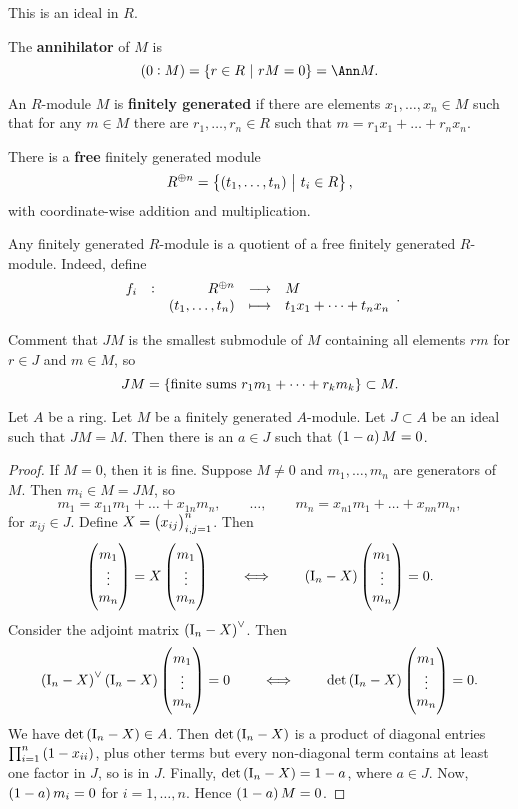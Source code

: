 This is an ideal in $ R $.

\begin{example*}
The \textbf{annihilator} of $ M $ is
$$ \br{0 : M} = \cbr{r \in R \st rM = 0} = \Ann M. $$
\end{example*}

\pagebreak

\begin{definition}
An $ R $-module $ M $ is \textbf{finitely generated} if there are elements $ x_1, \dots, x_n \in M $ such that for any $ m \in M $ there are $ r_1, \dots, r_n \in R $ such that $ m = r_1x_1 + \dots + r_nx_n $.
\end{definition}

\begin{example*}
There is a \textbf{free} finitely generated module
$$ R^{\oplus n} = \cbr{\br{t_1, \dots, t_n} \st t_i \in R}, $$
with coordinate-wise addition and multiplication.
\end{example*}

\begin{remark*}
Any finitely generated $ R $-module is a quotient of a free finitely generated $ R $-module. Indeed, define
$$ \function[f_i]{R^{\oplus n}}{M}{\br{t_1, \dots, t_n}}{t_1x_1 + \dots + t_nx_n}. $$
\end{remark*}

Comment that $ JM $ is the smallest submodule of $ M $ containing all elements $ rm $ for $ r \in J $ and $ m \in M $, so
$$ JM = \cbr{\text{finite sums} \ r_1m_1 + \dots + r_km_k} \subset M. $$

\begin{lemma}
\label{lem:9.7}
Let $ A $ be a ring. Let $ M $ be a finitely generated $ A $-module. Let $ J \subset A $ be an ideal such that $ JM = M $. Then there is an $ a \in J $ such that $ \br{1 - a}M = 0 $.
\end{lemma}

\begin{proof}
If $ M = 0 $, then it is fine. Suppose $ M \ne 0 $ and $ m_1, \dots, m_n $ are generators of $ M $. Then $ m_i \in M = JM $, so
$$ m_1 = x_{11}m_1 + \dots + x_{1n}m_n, \qquad \dots, \qquad m_n = x_{n1}m_1 + \dots + x_{nn}m_n, $$
for $ x_{ij} \in J $. Define $ X = \br{x_{ij}}_{i, j = 1}^n $. Then
$$ \threebyone{m_1}{\vdots}{m_n} = X\threebyone{m_1}{\vdots}{m_n} \qquad \iff \qquad \br{\I_n - X}\threebyone{m_1}{\vdots}{m_n} = 0. $$
Consider the adjoint matrix $ \br{\I_n - X}^\vee $. Then
$$ \br{\I_n - X}^\vee\br{\I_n - X}\threebyone{m_1}{\vdots}{m_n} = 0 \qquad \iff \qquad \det \br{\I_n - X}\threebyone{m_1}{\vdots}{m_n} = 0. $$
We have $ \det \br{\I_n - X} \in A $. Then $ \det \br{\I_n - X} $ is a product of diagonal entries $ \prod_{i = 1}^n \br{1 - x_{ii}} $, plus other terms but every non-diagonal term contains at least one factor in $ J $, so is in $ J $. Finally, $ \det \br{\I_n - X} = 1 - a $, where $ a \in J $. Now, $ \br{1 - a}m_i = 0 $ for $ i = 1, \dots, n $. Hence $ \br{1 - a}M = 0 $.
\end{proof}

